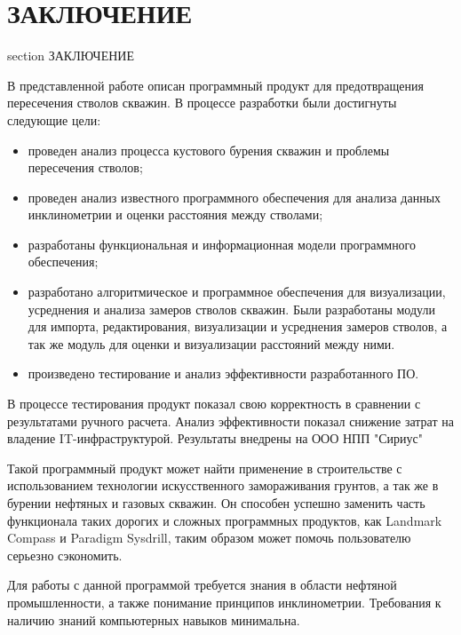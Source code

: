 \newpage
\section*{ЗАКЛЮЧЕНИЕ}
 {section} {ЗАКЛЮЧЕНИЕ}

В представленной работе описан программный продукт для предотвращения пересечения стволов скважин.
В процессе разработки были достигнуты следующие цели:

\begin{itemize}
  \item проведен анализ процесса кустового бурения скважин и проблемы пересечения стволов;
  \item проведен анализ известного программного обеспечения для анализа данных инклинометрии и оценки расстояния между стволами;
  \item разработаны функциональная и информационная модели программного обеспечения;
  \item разработано алгоритмическое и программное обеспечения для визуализации, усреднения и анализа замеров стволов скважин. Были разработаны модули для
    импорта, редактирования, визуализации и усреднения замеров стволов, а так же модуль для оценки и визуализации расстояний между ними. 
  \item произведено тестирование и анализ эффективности разработанного ПО.
\end{itemize}

В процессе тестирования продукт показал свою корректность в сравнении с результатами ручного расчета. Анализ эффективности показал
снижение затрат на владение IT-инфраструктурой. Результаты внедрены на ООО НПП "Сириус"

Такой программный продукт может найти применение в строительстве с использованием технологии искусственного замораживания
грунтов, а так же в бурении нефтяных и газовых скважин. Он способен успешно заменить часть функционала таких дорогих и сложных
программных продуктов, как Landmark Compass и Paradigm Sysdrill, таким образом может помочь пользователю серьезно сэкономить.

Для работы с данной программой требуется знания в области нефтяной промышленности, а также понимание принципов инклинометрии.
Требования к наличию знаний компьютерных навыков минимальна.
